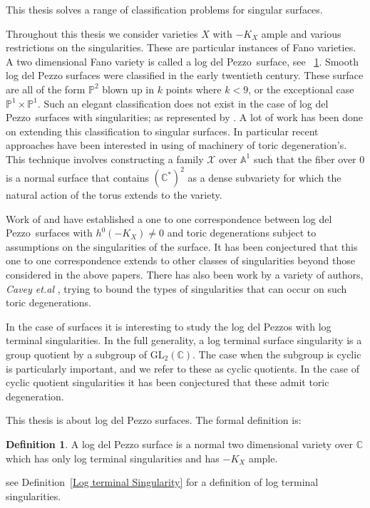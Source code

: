 \documentclass[12pt]{amsart}
\theoremstyle{definition}
\theoremstyle{definition}
\theoremstyle{definition}
\theoremstyle{definition}
\newtheorem{dfn}[thm]{Definition}
\theoremstyle{definition}
\theoremstyle{definition}
\theoremstyle{definition}
\theoremstyle{definition}
\newcommand{\C}[1]{(\mathbb{C}^*)^#1}
\newcommand{\ldp}{log del Pezzo}
\newcommand{\mb}[1]{\mathbb{#1}}
\newcommand{\gl}{\text{GL}_2 (\mathbb{C})}
\begin{document}
 

This thesis solves a range of classification problems for singular surfaces.


Throughout this thesis we consider varieties $X$ with $-K_X$ ample and various restrictions on the singularities. These are particular instances of Fano varieties. A two dimensional Fano variety is called a \ldp\ surface, see ~\ref{beginnersdef}. Smooth log del Pezzo surfaces were classified in the early twentieth century. These surface are all of the form $\mb{P}^2$ blown up in $k$ points where $k <9 $, or the exceptional case $\mb{P}^1 \times \mb{P}^1$. Such an elegant classification does not exist in the case of \ldp\ surfaces with singularities; as represented by \cite{Reid, etc....}. A lot of work has been done on extending this classification to singular surfaces. In particular recent approaches have been interested in using of machinery of toric degeneration's. This technique involves constructing a family $\mathcal{X}$ over $\mb{A}^1$ such that the fiber over $0$ is a normal surface that contains $\C{2}$ as a dense subvariety for which the natural action of the torus extends to the variety.  



 Work of \cite{CH} and \cite{AC} have established a one to one correspondence between \ldp\ surfaces with $h^0(-K_X) \neq 0$ and toric degenerations subject to assumptions on the singularities of the surface. It has been conjectured that this one to one correspondence extends to other classes of singularities beyond those considered in the above papers. There has also been work by a variety of authors, \emph{Cavey et.al} \cite {CSasd}, trying to bound the types of singularities that can occur on such toric degenerations. 
 
 
 


In the case of surfaces it is interesting to study the log del Pezzos with log terminal singularities. In the full generality, a log terminal surface singularity is a group quotient by a subgroup of $\gl$. The case when the subgroup is cyclic is particularly important, and we refer to these as cyclic quotients. In the case of cyclic quotient singularities it has been conjectured that these admit toric degeneration.


This thesis is about log del Pezzo surfaces. The formal definition is:
\begin{dfn}\label{beginnersdef}
A log del Pezzo surface is a normal two dimensional variety over $\mb{C}$ which has only log terminal singularities and has $-K_X$ ample.
\end{dfn}
see Definition~\ref{Log terminal Singularity} for a definition of log terminal singularities.
\end{document}
